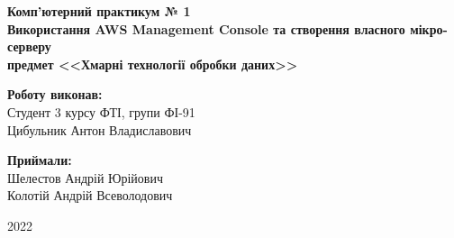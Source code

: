 \begin{titlepage}
    \begin{center}
        \begin{spacing}{1.5}
            \textbf{\Large{Комп'ютерний практикум № 1}} \\
            \vspace{1cm}\textbf{\Large{Використання AWS Management Console \linebreak та створення власного мікро-серверу}} \\ 
            \vspace{1cm}\textbf{\large{предмет <<Хмарні технології обробки даних>>}}
        \end{spacing}
    \end{center}

    \vspace{13em}

    \newlength{\maxname}

    \hfill\parbox{\maxname}{
        \begin{spacing}{1.1}
            \small{\textbf{Роботу виконав:}} \\ 
            \small{Студент 3 курсу ФТІ, групи ФІ-91} \\
            \small{Цибульник Антон Владиславович} \\
        \end{spacing}
    }
         
    \hfill\parbox{\maxname}{
        \begin{spacing}{1.1}
            \small{\textbf{Приймали:}} \\ 
            \small{Шелестов Андрій Юрійович} \\
            \small{Колотій Андрій Всеволодович} \\
        \end{spacing}
    }

    \vspace{\fill}
    
    \begin{center}
        \small{2022}
    \end{center}
    
\end{titlepage}